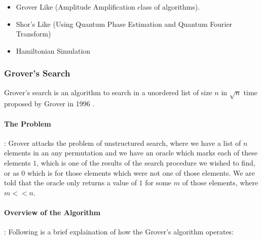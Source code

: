 \begin{itemize}
    \item Grover Like (Amplitude Amplification class of algorithms).
    \item Shor's Like (Using Quantum Phase Estimation and Quantum Fourier Transform)
    \item Hamiltonian Simulation 
\end{itemize}

\subsubsection{Grover's Search}

Grover's search is an algorithm to search in a unordered list of size $n$ in $\sqrt{n}$ time proposed by Grover in 1996 \cite{grover-search-original}.

\paragraph*{The Problem}: Grover attacks the problem of unstructured search, where we have a list of $n$ elements in an any permutation and we have an oracle which marks each of these elements $1$, which is one of the results of the search procedure we wished to find, or as $0$ which is for those elements which were not one of those elements. We are told that the oracle only returns a value of $1$ for some $m$ of those elements, where $m << n$.

\paragraph*{Overview of the Algorithm}: Following is a brief explaination of how the Grover's algorithm operates:

